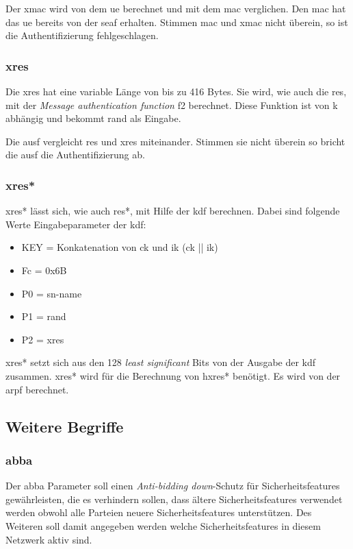 Der \gls{xmac} wird von dem \gls{ue} berechnet und mit dem \gls{mac} verglichen. 
Den \gls{mac} hat das \gls{ue} bereits von der \gls{seaf} erhalten.
Stimmen \gls{mac} und \gls{xmac} nicht überein, so ist die Authentifizierung fehlgeschlagen. %

\subsubsection{\gls{xres}}
Die \gls{xres} hat eine variable Länge von bis zu 416 Bytes. %
Sie wird, wie auch die \gls{res}, mit der \textit{Message authentication function} f2 berechnet. 
Diese Funktion ist von \gls{k} abhängig und bekommt \gls{rand} als Eingabe. %

Die \gls{ausf} vergleicht \gls{res} und \gls{xres} miteinander.
Stimmen sie nicht überein so bricht die \gls{ausf} die Authentifizierung ab. %

\subsubsection{\gls{xres*}}
\gls{xres*} lässt sich, wie auch \gls{res*}, mit Hilfe der \gls{kdf} berechnen.
Dabei sind folgende Werte Eingabeparameter der \gls{kdf}: %
\begin{itemize}
\item KEY = Konkatenation von \gls{ck} und \gls{ik} (\gls{ck} || \gls{ik})
\item Fc = 0x6B
\item P0 = \gls{sn-name}
\item P1 = \gls{rand}
\item P2 = \gls{xres}
\end{itemize}

\gls{xres*} setzt sich aus den 128 \textit{least significant} Bits von der Ausgabe der \gls{kdf} zusammen.
\gls{xres*} wird für die Berechnung von \gls{hxres*} benötigt.
Es wird von der \gls{arpf} berechnet.


\subsection{Weitere Begriffe}

\subsubsection{\gls{abba}}
Der \gls{abba} Parameter soll einen \textit{Anti-bidding down}-Schutz für Sicherheitsfeatures gewährleisten, die es verhindern sollen, dass ältere Sicherheitsfeatures verwendet werden obwohl alle Parteien neuere Sicherheitsfeatures unterstützen. %
Des Weiteren soll damit angegeben werden welche Sicherheitsfeatures in diesem Netzwerk aktiv sind.

